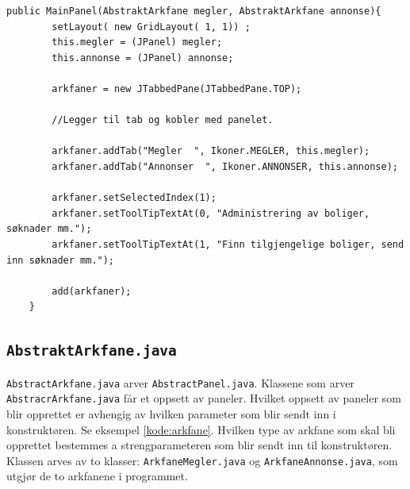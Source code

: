 \begin{lstlisting}[caption=Kontruktør i \texttt{MainPanel.java}, label=kode:main_panel]
    public MainPanel(AbstraktArkfane megler, AbstraktArkfane annonse){
        setLayout( new GridLayout( 1, 1)) ;
        this.megler = (JPanel) megler;
        this.annonse = (JPanel) annonse;
        
        arkfaner = new JTabbedPane(JTabbedPane.TOP);
        
        //Legger til tab og kobler med panelet.
        
        arkfaner.addTab("Megler  ", Ikoner.MEGLER, this.megler);
        arkfaner.addTab("Annonser  ", Ikoner.ANNONSER, this.annonse);
        
        arkfaner.setSelectedIndex(1);
        arkfaner.setToolTipTextAt(0, "Administrering av boliger, søknader mm.");
        arkfaner.setToolTipTextAt(1, "Finn tilgjengelige boliger, send inn søknader mm.");
        
        add(arkfaner);
    }
\end{lstlisting}



\subsection{\texttt{AbstraktArkfane.java}}
\texttt{AbstractArkfane.java} arver \texttt{AbstractPanel.java}. Klassene som arver \texttt{AbstracrArkfane.java} får et oppsett av paneler. Hvilket oppsett av paneler som blir opprettet er avhengig av hvilken parameter som blir sendt inn i konstruktøren. Se eksempel \ref{kode:arkfane}. Hvilken type av arkfane som skal bli opprettet bestemmes a strengparameteren som blir sendt inn til konstruktøren. Klassen arves av to klasser: \texttt{ArkfaneMegler.java} og \texttt{ArkfaneAnnonse.java}, som utgjør de to arkfanene i programmet. 

